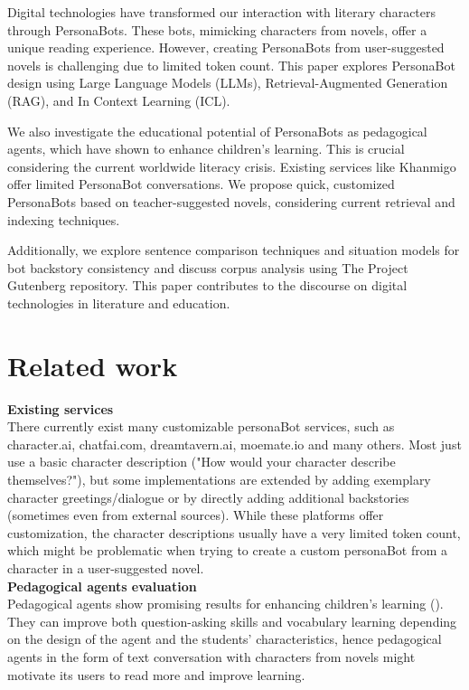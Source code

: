 \documentclass[fleqn,moreauthors,10pt]{ds_report}
\begin{document}
Digital technologies have transformed our interaction with literary characters through PersonaBots. These bots, mimicking characters from novels, offer a unique reading experience. However, creating PersonaBots from user-suggested novels is challenging due to limited token count. This paper explores PersonaBot design using Large Language Models (LLMs), Retrieval-Augmented Generation (RAG), and In Context Learning (ICL).

We also investigate the educational potential of PersonaBots as pedagogical agents, which have shown to enhance children's learning. This is crucial considering the current worldwide literacy crisis. Existing services like Khanmigo offer limited PersonaBot conversations. We propose quick, customized PersonaBots based on teacher-suggested novels, considering current retrieval and indexing techniques.

Additionally, we explore sentence comparison techniques and situation models for bot backstory consistency and discuss corpus analysis using The Project Gutenberg repository. This paper contributes to the discourse on digital technologies in literature and education.



\section*{Related work}
\textbf{Existing services} \\
There currently exist many customizable personaBot services, such as character.ai, chatfai.com, dreamtavern.ai, moemate.io and many others. Most just use a basic character description ("How would your character describe themselves?"), but some implementations are extended by adding exemplary character greetings/dialogue or by directly adding additional backstories (sometimes even from external sources). While these platforms offer customization, the character descriptions usually have a very limited token count, which might be problematic when trying to create a custom personaBot from a character in a user-suggested novel.\\
\textbf{Pedagogical agents evaluation} \\
Pedagogical agents show promising results for enhancing children's learning (\cite{DBLP:journals/corr/abs-2004-03472}\cite{doi:10.1177/0735633117708283}). They can improve both question-asking skills and vocabulary learning depending on the design of the agent and the students' characteristics, hence pedagogical agents in the form of text conversation with characters from novels might motivate its users to read more and improve learning. \\
\end{document}
